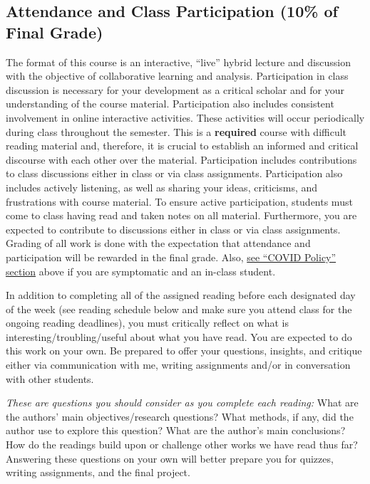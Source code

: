\documentclass[11pt,]{article}
\begin{document}
\newpage

\hypertarget{attendance-and-class-participation-10-of-final-grade}{%
\subsection{Attendance and Class Participation (10\% of Final
Grade)}\label{attendance-and-class-participation-10-of-final-grade}}

The format of this course is an interactive, ``live'' hybrid lecture and
discussion with the objective of collaborative learning and analysis.
Participation in class discussion is necessary for your development as a
critical scholar and for your understanding of the course material.
Participation also includes consistent involvement in online interactive
activities. These activities will occur periodically during class
throughout the semester. This is a \textbf{required} course with
difficult reading material and, therefore, it is crucial to establish an
informed and critical discourse with each other over the material.
Participation includes contributions to class discussions either in
class or via class assignments. Participation also includes actively
listening, as well as sharing your ideas, criticisms, and frustrations
with course material. To ensure active participation, students must come
to class having read and taken notes on all material. Furthermore, you
are expected to contribute to discussions either in class or via class
assignments. Grading of all work is done with the expectation that
attendance and participation will be rewarded in the final grade. Also,
\protect\hyperlink{covid_policy}{see ``COVID Policy'' section} above if
you are symptomatic and an in-class student.

In addition to completing all of the assigned reading before each
designated day of the week (see reading schedule below and make sure you
attend class for the ongoing reading deadlines), you must critically
reflect on what is interesting/troubling/useful about what you have
read. You are expected to do this work on your own. Be prepared to offer
your questions, insights, and critique either via communication with me,
writing assignments and/or in conversation with other students.

\emph{These are questions you should consider as you complete each
reading:} What are the authors' main objectives/research questions? What
methods, if any, did the author use to explore this question? What are
the author's main conclusions? How do the readings build upon or
challenge other works we have read thus far? Answering these questions
on your own will better prepare you for quizzes, writing assignments,
and the final project.
\end{document}
